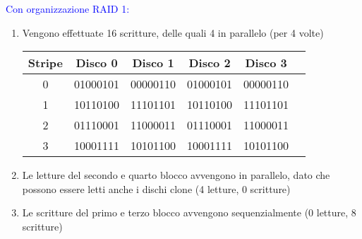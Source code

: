 \documentclass[12pt]{article}
\begin{document}
\textcolor{blue}{Con organizzazione RAID 1:}
\begin{enumerate}
    \color{blue}
    \item Vengono effettuate 16 scritture, delle quali 4 in parallelo (per 4 volte)\\
    \begin{tabular}{|c|c|c|c|c|c|}
        \hline
        Stripe & Disco 0 & Disco 1 & Disco 2 & Disco 3\\
        \hline
        0 & 01000101 & 00000110 & 01000101 & 00000110 \\
        \hline
        1 & 10110100 & 11101101 & 10110100 & 11101101 \\
        \hline
        2 & 01110001 & 11000011 & 01110001 & 11000011 \\
        \hline
        3 & 10001111 & 10101100 & 10001111 & 10101100 \\
        \hline
    \end{tabular}
    \item Le letture del secondo e quarto blocco avvengono in parallelo, dato che possono essere letti anche i dischi clone (4 letture, 0 scritture)
    \item Le scritture del primo e terzo blocco avvengono sequenzialmente (0 letture, 8 scritture)
\end{enumerate}
\end{document}

